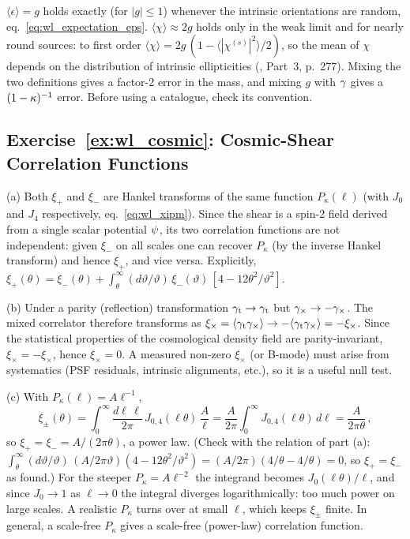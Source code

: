 \begin{annotation}
$\langle\epsilon\rangle = g$ holds exactly (for $|g| \le 1$) whenever the
intrinsic orientations are random, eq.~\eqref{eq:wl_expectation_eps}.
$\langle\chi\rangle \approx 2g$ holds only in the weak limit and for nearly
round sources: to first order $\langle\chi\rangle = 2g\,(1 -
\langle|\chi^{(s)}|^2\rangle/2)$, so the mean of $\chi$ depends on the
distribution of intrinsic ellipticities
(\citealp{schneider_kochanek_wambsganss_2006}, Part~3, p.~277).  Mixing the two definitions gives a
factor-2 error in the mass, and mixing $g$ with $\gamma$ gives a
$(1-\kappa)^{-1}$ error.  Before using a catalogue, check its convention.
\end{annotation}

\subsection*{Exercise~\ref{ex:wl_cosmic}: Cosmic-Shear Correlation Functions}

(a) Both $\xi_+$ and $\xi_-$ are Hankel transforms of the
same function $P_\kappa(\ell)$ (with $J_0$ and $J_4$
respectively, eq.~\ref{eq:wl_xipm}).  Since the shear is a spin-2 field
derived from a single scalar potential $\psi$, its two correlation
functions are not independent: given $\xi_-$ on all scales one can recover
$P_\kappa$ (by the inverse Hankel transform) and hence $\xi_+$, and vice
versa.  Explicitly, $\xi_+(\theta) = \xi_-(\theta) + \int_\theta^\infty
(d\vartheta/\vartheta)\,\xi_-(\vartheta)\,[4 - 12\theta^2/\vartheta^2]$.

(b) Under a parity (reflection) transformation
$\gamma_{\mathrm t} \to \gamma_{\mathrm t}$ but
$\gamma_\times \to -\gamma_\times$.  The mixed correlator therefore
transforms as $\xi_\times = \langle\gamma_{\mathrm t}\gamma_\times\rangle
\to -\langle\gamma_{\mathrm t}\gamma_\times\rangle = -\xi_\times$.  Since
the statistical properties of the cosmological density field are
parity-invariant, $\xi_\times = -\xi_\times$, hence $\xi_\times = 0$.  A
measured non-zero $\xi_\times$ (or B-mode) must arise from systematics
(PSF residuals, intrinsic alignments, etc.), so it is a useful null
test. \checkmark

(c) With $P_\kappa(\ell) = A\ell^{-1}$,
\begin{equation*}
    \xi_\pm(\theta) = \int_0^\infty \frac{d\ell\,\ell}{2\pi}\,
    J_{0,4}(\ell\theta)\,\frac{A}{\ell}
    = \frac{A}{2\pi}\int_0^\infty J_{0,4}(\ell\theta)\,d\ell
    = \frac{A}{2\pi\theta}\,,
\end{equation*}
so $\xi_+ = \xi_- = A/(2\pi\theta)$, a power law.  (Check with the relation
of part (a): $\int_\theta^\infty (d\vartheta/\vartheta)\,
(A/2\pi\vartheta)(4 - 12\theta^2/\vartheta^2) = (A/2\pi)(4/\theta -
4/\theta) = 0$, so $\xi_+ = \xi_-$ as found.)  For the steeper
$P_\kappa = A\ell^{-2}$ the integrand becomes $J_0(\ell\theta)/\ell$, and
since $J_0 \to 1$ as $\ell \to 0$ the integral diverges logarithmically:
too much power on large scales.  A realistic $P_\kappa$ turns over at
small $\ell$, which keeps $\xi_\pm$ finite.  In general, a scale-free
$P_\kappa$ gives a scale-free (power-law) correlation function.
\checkmark

